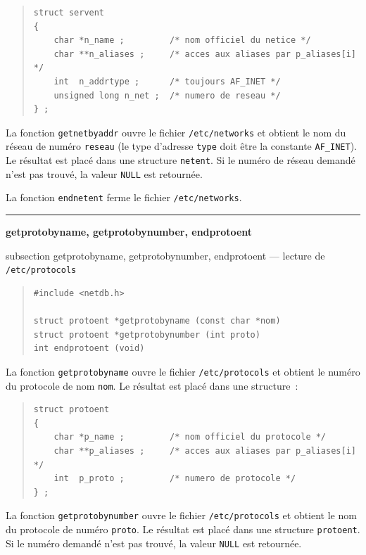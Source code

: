 \documentclass [twoside] {report}
\newcommand {\primitive} [1]
    {
	\phantomsection
	{\large \textbf {#1}}
	\addcontentsline {toc} {subsection} {#1}
    }
\newcommand {\separation}
    {
	\vspace {5mm}
	\nopagebreak
	\hrule
    }
\begin{document}
\begin {quote}
    \small
\begin {verbatim}
struct servent
{
    char *n_name ;         /* nom officiel du netice */
    char **n_aliases ;     /* acces aux aliases par p_aliases[i] */
    int  n_addrtype ;      /* toujours AF_INET */
    unsigned long n_net ;  /* numero de reseau */
} ;
\end{verbatim}
\end {quote}

La fonction \texttt {getnetbyaddr} ouvre le fichier \texttt {/etc/networks} et
obtient le nom du réseau de numéro \texttt {reseau} (le type d'adresse
\texttt {type} doit être la constante \texttt {AF\_INET}).  Le résultat est placé
dans une structure \texttt {netent}.  Si le numéro de réseau demandé n'est
pas trouvé, la valeur \texttt {NULL} est retournée.

La fonction \texttt {endnetent} ferme le fichier \texttt {/etc/networks}.


\separation
\primitive {getprotobyname, getprotobynumber,
endprotoent} --- lecture de \texttt {/etc/protocols}

\begin {quote}
\begin {verbatim}
#include <netdb.h>

struct protoent *getprotobyname (const char *nom)
struct protoent *getprotobynumber (int proto)
int endprotoent (void)
\end{verbatim}
\end {quote}

La fonction \texttt {getprotobyname} ouvre le fichier \texttt {/etc/protocols}
et obtient le numéro du protocole de nom \texttt {nom}.  Le résultat est
placé dans une structure~:

\begin {quote}
    \small
\begin {verbatim}
struct protoent
{
    char *p_name ;         /* nom officiel du protocole */
    char **p_aliases ;     /* acces aux aliases par p_aliases[i] */
    int  p_proto ;         /* numero de protocole */
} ;
\end{verbatim}
\end {quote}

La fonction \texttt {getprotobynumber} ouvre le fichier \texttt {/etc/protocols}
et obtient le nom du protocole de numéro \texttt {proto}.  Le résultat est
placé dans une structure \texttt {protoent}.  Si le numéro demandé n'est pas
trouvé, la valeur \texttt {NULL} est retournée.
\end{document}
